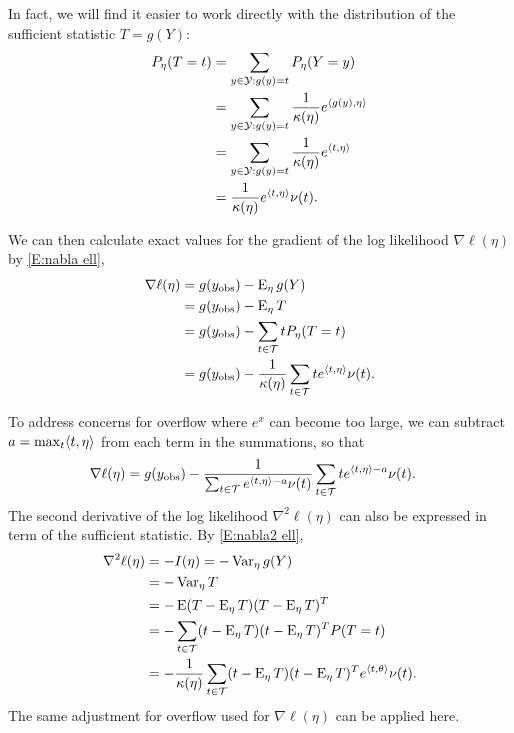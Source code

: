 In fact, we will find it easier to work directly with the distribution of the sufficient
statistic $T=g(Y)$:
\begin{align*}
	P_\eta(T=t) 	&= \sum_{y \in {\mathcal Y}: g(y) = t} P_\eta(Y= y ) \\
		 		&= \sum_{y \in {\mathcal Y}: g(y) = t} \frac{1}{\kappa(\eta)} e^{\langle g(y),\eta \rangle } \\
				&= \sum_{y \in {\mathcal Y}: g(y) = t} \frac{1}{\kappa(\eta)} e^{\langle t,\eta \rangle } \\
				&= \frac{1}{\kappa(\eta)} e^{\langle t,\eta \rangle } \nu(t).
\end{align*}

We can then calculate exact values for the gradient of the log likelihood $\nabla \ell(\eta)$ by \eqref{E:nabla ell},
\begin{align*}
	\nabla \ell (\eta) &= g(y_{\text{obs}}) - \operatorname{E}_\eta g(Y)\\ 
					  &= g(y_{\text{obs}}) - \operatorname{E}_\eta T \\
					  &= g(y_{\text{obs}}) - \sum_{t \in {\mathcal T}} t P_\eta(T = t) \\
					  &= g(y_{\text{obs}}) - \frac{1}{\kappa(\eta)}  \sum_{t \in {\mathcal T}} t e^{\langle t,\eta \rangle } \nu(t).
\end{align*}

To address concerns for overflow where $e^x$ can become too large, we 
can subtract $a = \max_t \langle t, \eta \rangle$ from each term in the summations, so that
\begin{align*}
	\nabla \ell (\eta) &= g(y_{\text{obs}}) - \frac{1}{\sum_{t \in {\mathcal T}} e^{\langle t,\eta \rangle-a} \nu(t)}  \sum_{t \in {\mathcal T}} t e^{\langle t,\eta \rangle-a} \nu(t).
\end{align*}
The second derivative of the log likelihood $\nabla ^2 \ell(\eta)$ can also be 
expressed in term of the sufficient statistic.  By \eqref{E:nabla2 ell},
\begin{align*}
	\nabla ^2 \ell(\eta) &= - I(\eta) = -\operatorname{Var}_\eta g(Y) \\
	&= -\operatorname{Var}_\eta T \\ 
	&= - \operatorname{E} (T - \operatorname{E}_\eta T)( T - \operatorname{E}_\eta T)^T \\
				&= - \sum_{t \in {\mathcal T}} (t - \operatorname{E}_\eta T)(t - \operatorname{E}_\eta T)^T P(T=t)\\
				&= - \frac{1}{\kappa(\eta)} \sum_{t\in {\mathcal T}}
					(t - \operatorname{E}_\eta T)(t - \operatorname{E}_\eta T)^T e^{\langle t,\theta \rangle} \nu(t).
\end{align*}
The same adjustment for overflow used for $\nabla \ell(\eta)$ can be applied here.

